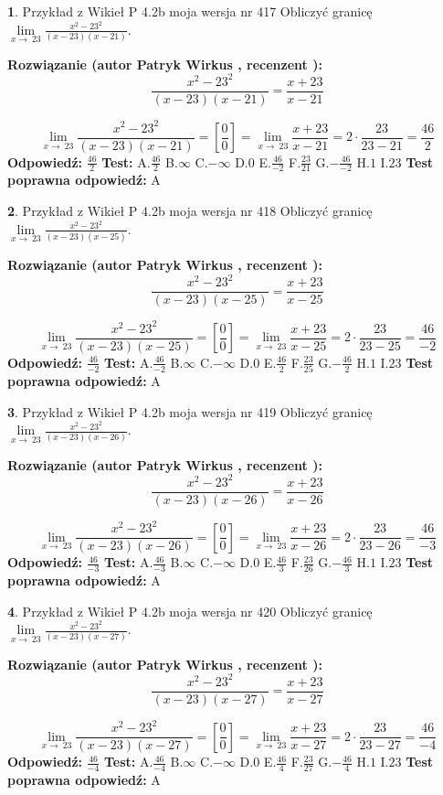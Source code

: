 \documentclass[12pt, a4paper]{article}
\theoremstyle{definition} %
\newtheorem{zad}{}
\newcommand{\zadStart}[1]{\begin{zad}#1\newline}
\newcommand{\zadStop}{\end{zad}}
\newcommand{\rozwStart}[2]{\noindent \textbf{Rozwiązanie (autor #1 , recenzent #2): }\newline}
\newcommand{\rozwStop}{\newline}
\newcommand{\odpStart}{\noindent \textbf{Odpowiedź:}\newline}
\newcommand{\odpStop}{\newline}
\newcommand{\testStart}{\noindent \textbf{Test:}\newline}
\newcommand{\testStop}{\newline}
\newcommand{\kluczStart}{\noindent \textbf{Test poprawna odpowiedź:}\newline}
\newcommand{\kluczStop}{\newline}
\begin{document}
\zadStart{Przykład z Wikieł P 4.2b moja wersja nr 417}
Obliczyć granicę $\lim\limits_{x\to\ 23}\frac{x^{2}-23^{2}}{(x-23)(x-21)}$.
\zadStop
\rozwStart{Patryk Wirkus}{}
$$\frac{x^{2}-23^{2}}{(x-23)(x-21)}=\frac{x+23}{x-21}$$

$$\lim\limits_{x\to\ 23}\frac{x^{2}-23^{2}}{(x-23)(x-21)}=[\frac{0}{0}]=\lim\limits_{x\to\ 23}\frac{x+23}{x-21}=2 \cdot \frac{23}{23-21} = \frac{46}{2}$$
\rozwStop
\odpStart
$\frac{46}{2}$
\odpStop
\testStart
A.$\frac{46}{2}$
B.$\infty$
C.$-\infty$
D.$0$
E.$\frac{46}{-2}$
F.$\frac{23}{21}$
G.$-\frac{46}{-2}$
H.$1$
I.$23$
\testStop
\kluczStart
A
\kluczStop



\zadStart{Przykład z Wikieł P 4.2b moja wersja nr 418}
Obliczyć granicę $\lim\limits_{x\to\ 23}\frac{x^{2}-23^{2}}{(x-23)(x-25)}$.
\zadStop
\rozwStart{Patryk Wirkus}{}
$$\frac{x^{2}-23^{2}}{(x-23)(x-25)}=\frac{x+23}{x-25}$$

$$\lim\limits_{x\to\ 23}\frac{x^{2}-23^{2}}{(x-23)(x-25)}=[\frac{0}{0}]=\lim\limits_{x\to\ 23}\frac{x+23}{x-25}=2 \cdot \frac{23}{23-25} = \frac{46}{-2}$$
\rozwStop
\odpStart
$\frac{46}{-2}$
\odpStop
\testStart
A.$\frac{46}{-2}$
B.$\infty$
C.$-\infty$
D.$0$
E.$\frac{46}{2}$
F.$\frac{23}{25}$
G.$-\frac{46}{2}$
H.$1$
I.$23$
\testStop
\kluczStart
A
\kluczStop



\zadStart{Przykład z Wikieł P 4.2b moja wersja nr 419}
Obliczyć granicę $\lim\limits_{x\to\ 23}\frac{x^{2}-23^{2}}{(x-23)(x-26)}$.
\zadStop
\rozwStart{Patryk Wirkus}{}
$$\frac{x^{2}-23^{2}}{(x-23)(x-26)}=\frac{x+23}{x-26}$$

$$\lim\limits_{x\to\ 23}\frac{x^{2}-23^{2}}{(x-23)(x-26)}=[\frac{0}{0}]=\lim\limits_{x\to\ 23}\frac{x+23}{x-26}=2 \cdot \frac{23}{23-26} = \frac{46}{-3}$$
\rozwStop
\odpStart
$\frac{46}{-3}$
\odpStop
\testStart
A.$\frac{46}{-3}$
B.$\infty$
C.$-\infty$
D.$0$
E.$\frac{46}{3}$
F.$\frac{23}{26}$
G.$-\frac{46}{3}$
H.$1$
I.$23$
\testStop
\kluczStart
A
\kluczStop



\zadStart{Przykład z Wikieł P 4.2b moja wersja nr 420}
Obliczyć granicę $\lim\limits_{x\to\ 23}\frac{x^{2}-23^{2}}{(x-23)(x-27)}$.
\zadStop
\rozwStart{Patryk Wirkus}{}
$$\frac{x^{2}-23^{2}}{(x-23)(x-27)}=\frac{x+23}{x-27}$$

$$\lim\limits_{x\to\ 23}\frac{x^{2}-23^{2}}{(x-23)(x-27)}=[\frac{0}{0}]=\lim\limits_{x\to\ 23}\frac{x+23}{x-27}=2 \cdot \frac{23}{23-27} = \frac{46}{-4}$$
\rozwStop
\odpStart
$\frac{46}{-4}$
\odpStop
\testStart
A.$\frac{46}{-4}$
B.$\infty$
C.$-\infty$
D.$0$
E.$\frac{46}{4}$
F.$\frac{23}{27}$
G.$-\frac{46}{4}$
H.$1$
I.$23$
\testStop
\kluczStart
A
\kluczStop
\end{document}
